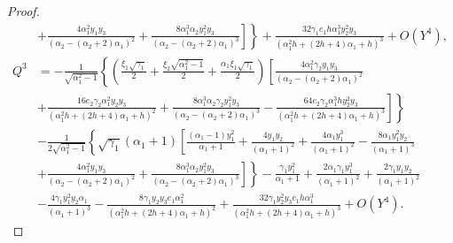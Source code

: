 \documentclass{ws-ijbc}
\begin{document}
\begin{proof}
{\begin{equation*}
\begin{aligned}
                              &\left.\left.+\frac{4 \alpha_{1}^{2} y_{1} y_{3}}{\left(\alpha_{2}-\left(\alpha_{2}+2\right) \alpha_{1}\right)^{2}}+\frac{8 \alpha_{1}^{3} \alpha_{2} y_{1}^{2} y_{3}}{\left(\alpha_{2}-\left(\alpha_{2}+2\right) \alpha_{1}\right)^{3}}\right]\right\}+\frac{32 \gamma_{1}e_{1} h \alpha_{1}^{3} y_{2}^{2} y_{3} }{\left(\alpha_{1}^{2} h +\left(2 h +4\right) \alpha_{1}+h \right)^{3}}+O\left(Y^{4}\right),\\
Q^{3}&=-\frac{1}{\sqrt{\alpha_{1}^{2}-1}}\left\{(\frac{\xi_{1} \sqrt{\gamma_{1}}}{2}+\frac{\xi_{2} \sqrt{\alpha_{1}^{2}-1}}{2}+\frac{\alpha_{1} \xi_{1} \sqrt{\gamma_{1}}}{2})\left[\frac{4 \alpha_{1}^{2} \gamma_{2} y_{1} y_{3}}{\left(\alpha_{2}-\left(\alpha_{2}+2\right)\alpha_{1}\right)^{2}}\right.\right.\\
                              &\left.\left.+\frac{16 e_{2} \gamma_{2}\alpha_{1}^{2} y_{2} y_{3} }{\left(\alpha_{1}^{2} h +\left(2 h +4\right) \alpha_{1}+h \right)^{2}}
                              +\frac{8 \alpha_{1}^{3} \alpha_{2} \gamma_{2} y_{1}^{2} y_{3}}{\left(\alpha_{2}-\left(\alpha_{2}+2\right) \alpha_{1}\right)^{3}}-\frac{64 e_{2} \gamma_{2} \alpha_{1}^{3} h y_{2}^{2} y_{3}}{\left(\alpha_{1}^{2} h +\left(2 h +4\right) \alpha_{1}+h \right)^{3}}\right]\right\}\\
                              &-\frac{1}{2\sqrt{\alpha_{1}^{2}-1}}\left\{\sqrt{\gamma_{1}}\left(\alpha_{1}+1\right) \left[\frac{(\alpha_{1}-1)y_{1}^{2}}{\alpha_{1}+1}+\frac{4y_{1} y_{2}}{\left(\alpha_{1}+1\right)^{2}}+\frac{4\alpha_{1} y_{1}^{3}}{\left(\alpha_{1}+1\right)^{2}}-\frac{8\alpha_{1} y_{1}^{2} y_{2}}{\left(\alpha_{1}+1\right)^{3}}\right.\right.\\
                              &\left.\left.+\frac{4 \alpha_{1}^{2} y_{1} y_{3}}{\left(\alpha_{2}-\left(\alpha_{2}+2\right) \alpha_{1}\right)^{2}}
                              +\frac{8 \alpha_{1}^{3} \alpha_{2} y_{1}^{2} y_{3}}{\left(\alpha_{2}-\left(\alpha_{2}+2\right) \alpha_{1}\right)^{3}}\right]\right\}-\frac{\gamma_{1} y_{1}^{2}}{\alpha_{1}+1}+\frac{2 \alpha_{1} \gamma_{1} y_{1}^{3}}{\left(\alpha_{1}+1\right)^{2}}+\frac{2 \gamma_{1} y_{1} y_{2}}{\left(\alpha_{1}+1\right)^{2}}\\
                              &-\frac{4 \gamma_{1} y_{1}^{2} y_{2} \alpha_{1}}{\left(\alpha_{1}+1\right)^{3}}-\frac{8 \gamma_{1} y_{2} y_{3} e_{1} \alpha_{1}^{2}}{\left(\alpha_{1}^{2} h +\left(2 h +4\right) \alpha_{1}+h \right)^{2}}+\frac{32 \gamma_{1} y_{2}^{2} y_{3} e_{1} h \alpha_{1}^{3}}{\left(\alpha_{1}^{2} h +\left(2 h +4\right) \alpha_{1}+h \right)^{3}}+O\left(Y^{4}\right).

\end{aligned}
\end{equation*}}
\end{proof}
\end{document}

